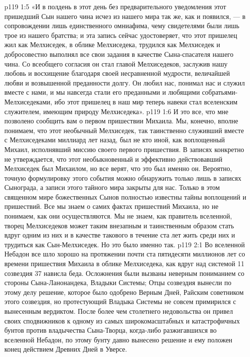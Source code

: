 \vs p119 1:5 «И в полдень в этот день без предварительного уведомления этот пришедший Сын нашего чина исчез из нашего мира так же, как и появился, --- в сопровождении лишь единственного омниафима, чему свидетелями были лишь трое из нашего братства; и эта запись сейчас удостоверяет, что этот пришелец жил как Мелхиседек, в облике Мелхиседека, трудился как Мелхиседек и добросовестно выполнял все свои задания в качестве Сына\hyp{}спасателя нашего чина. Со всеобщего согласия он стал главой Мелхиседеков, заслужив нашу любовь и восхищение благодаря своей несравненной мудрости, величайшей любви и возвышенной преданности долгу. Он любил нас, понимал нас и служил вместе с нами, и мы навсегда стали его преданными и любящими собратьями\hyp{}Мелхиседеками, ибо этот пришелец в наш мир теперь навеки стал вселенским служителем, имеющим природу Мелхиседека».
\vs p119 1:6 И это все, что мне позволено сообщить вам о первом пришествии Михаила. Мы, конечно, вполне понимаем, что этот необычный Мелхиседек, так таинственно служивший вместе с Мелхиседеками миллиард лет назад, был не кто иной, как воплощенный Михаил, исполнявший миссию своего первого пришествия. В записях конкретно не утверждается, что этот необыкновенный и эффективно действовавший Мелхиседек был Михаилом, но все верят, что это был именно он. Вероятно, точную формулировку этого события можно обнаружить только лишь в записях Сынограда, а записи этого тайного мира закрыты для нас. Только в этом священном мире божественных Сынов полностью известны тайны воплощений и пришествий. Все мы знаем о самих фактах пришествий Михаила, но не понимаем, как они осуществляются. Мы не знаем, как правитель вселенной, творец Мелхиседеков может таким внезапным и таинственным образом стать вдруг одним из них и в качестве такового в течение ста лет жить среди них и трудиться как Сын\hyp{}Мелхиседек. Но это было именно так.
\vs p119 2:1 Во вселенной Небадон все шло хорошо на протяжении почти ста пятидесяти миллионов лет со времени пришествия Михаила в облике Мелхиседека, как вдруг над системой 11 созвездия 37 нависла беда. Осложнения были вызваны неверным пониманием со стороны Сына\hyp{}Ланонандека, Владыки Системы; Отцы созвездия вынесли по этому делу решение, которое было одобрено Верным Дней, Райским советником этого созвездия, но протестующий Владыка Системы не совсем примирился с вынесенным вердиктом. После более чем столетнего недовольства он привел своих сподвижников к одному из самых широкомасштабных и катастрофичных бунтов против владычества Сына\hyp{}Творца, когда\hyp{}либо разжигавшихся во вселенной Небадон, по этому бунту давно вынесено решение и ему положен конец действием Древних Дней в Уверсе.
